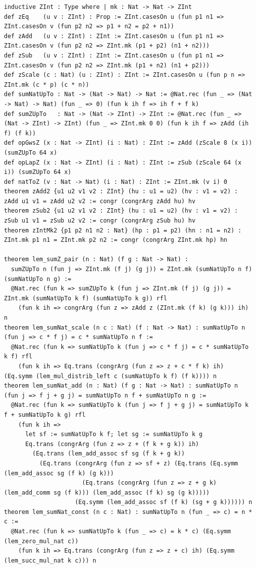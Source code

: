 \documentclass[11pt,letterpaper]{article}
\theoremstyle{spectralthm}
\begin{document}
\begin{lstlisting}[language=Lean4,caption={Standalone Pure Init.Prelude Term-Mode Lean 4 Kernel Suite (thm30--thm61, v0.0.0, 0 sorry, 0 axioms).},label={lst:lean_unified}]
inductive ZInt : Type where | mk : Nat -> Nat -> ZInt
def zEq    (u v : ZInt) : Prop := ZInt.casesOn u (fun p1 n1 => ZInt.casesOn v (fun p2 n2 => p1 + n2 = p2 + n1))
def zAdd   (u v : ZInt) : ZInt := ZInt.casesOn u (fun p1 n1 => ZInt.casesOn v (fun p2 n2 => ZInt.mk (p1 + p2) (n1 + n2)))
def zSub   (u v : ZInt) : ZInt := ZInt.casesOn u (fun p1 n1 => ZInt.casesOn v (fun p2 n2 => ZInt.mk (p1 + n2) (n1 + p2)))
def zScale (c : Nat) (u : ZInt) : ZInt := ZInt.casesOn u (fun p n => ZInt.mk (c * p) (c * n))
def sumNatUpTo : Nat -> (Nat -> Nat) -> Nat := @Nat.rec (fun _ => (Nat -> Nat) -> Nat) (fun _ => 0) (fun k ih f => ih f + f k)
def sumZUpTo   : Nat -> (Nat -> ZInt) -> ZInt := @Nat.rec (fun _ => (Nat -> ZInt) -> ZInt) (fun _ => ZInt.mk 0 0) (fun k ih f => zAdd (ih f) (f k))
def opGwsZ (x : Nat -> ZInt) (i : Nat) : ZInt := zAdd (zScale 8 (x i)) (sumZUpTo 64 x)
def opLapZ (x : Nat -> ZInt) (i : Nat) : ZInt := zSub (zScale 64 (x i)) (sumZUpTo 64 x)
def natToZ (v : Nat -> Nat) (i : Nat) : ZInt := ZInt.mk (v i) 0
theorem zAdd2 {u1 u2 v1 v2 : ZInt} (hu : u1 = u2) (hv : v1 = v2) : zAdd u1 v1 = zAdd u2 v2 := congr (congrArg zAdd hu) hv
theorem zSub2 {u1 u2 v1 v2 : ZInt} (hu : u1 = u2) (hv : v1 = v2) : zSub u1 v1 = zSub u2 v2 := congr (congrArg zSub hu) hv
theorem zIntMk2 {p1 p2 n1 n2 : Nat} (hp : p1 = p2) (hn : n1 = n2) : ZInt.mk p1 n1 = ZInt.mk p2 n2 := congr (congrArg ZInt.mk hp) hn

theorem lem_sumZ_pair (n : Nat) (f g : Nat -> Nat) :
  sumZUpTo n (fun j => ZInt.mk (f j) (g j)) = ZInt.mk (sumNatUpTo n f) (sumNatUpTo n g) :=
  @Nat.rec (fun k => sumZUpTo k (fun j => ZInt.mk (f j) (g j)) = ZInt.mk (sumNatUpTo k f) (sumNatUpTo k g)) rfl
    (fun k ih => congrArg (fun z => zAdd z (ZInt.mk (f k) (g k))) ih) n
theorem lem_sumNat_scale (n c : Nat) (f : Nat -> Nat) : sumNatUpTo n (fun j => c * f j) = c * sumNatUpTo n f :=
  @Nat.rec (fun k => sumNatUpTo k (fun j => c * f j) = c * sumNatUpTo k f) rfl
    (fun k ih => Eq.trans (congrArg (fun z => z + c * f k) ih) (Eq.symm (lem_mul_distrib_left c (sumNatUpTo k f) (f k)))) n
theorem lem_sumNat_add (n : Nat) (f g : Nat -> Nat) : sumNatUpTo n (fun j => f j + g j) = sumNatUpTo n f + sumNatUpTo n g :=
  @Nat.rec (fun k => sumNatUpTo k (fun j => f j + g j) = sumNatUpTo k f + sumNatUpTo k g) rfl
    (fun k ih =>
      let sf := sumNatUpTo k f; let sg := sumNatUpTo k g
      Eq.trans (congrArg (fun z => z + (f k + g k)) ih)
        (Eq.trans (lem_add_assoc sf sg (f k + g k))
          (Eq.trans (congrArg (fun z => sf + z) (Eq.trans (Eq.symm (lem_add_assoc sg (f k) (g k)))
                      (Eq.trans (congrArg (fun z => z + g k) (lem_add_comm sg (f k))) (lem_add_assoc (f k) sg (g k)))))
                    (Eq.symm (lem_add_assoc sf (f k) (sg + g k)))))) n
theorem lem_sumNat_const (n c : Nat) : sumNatUpTo n (fun _ => c) = n * c :=
  @Nat.rec (fun k => sumNatUpTo k (fun _ => c) = k * c) (Eq.symm (lem_zero_mul_nat c))
    (fun k ih => Eq.trans (congrArg (fun z => z + c) ih) (Eq.symm (lem_succ_mul_nat k c))) n


\end{lstlisting}
\end{document}
